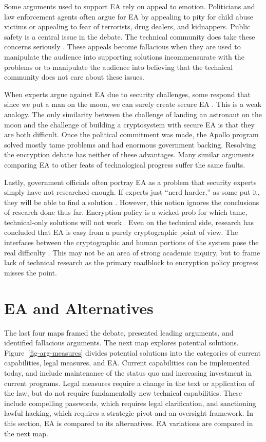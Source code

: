 \documentclass{IEEEtran}
\newcommand{\myfig}[1]{Figure~\ref{#1}}
\begin{document}
Some arguments used to support \ac{EA} rely on appeal to emotion. Politicians and law enforcement agents often argue for
\ac{EA} by appealing to pity for child abuse victims or appealing to fear of terrorists, drug dealers, and kidnappers.
Public safety is a central issue in the debate. The technical community does take these concerns seriously
\cite{schneier_scaring_2019}. These appeals become fallacious when they are used to manipulate the audience into
supporting solutions incommensurate with the problems or to manipulate the audience into believing that the technical
community does not care about these issues.

When experts argue against \ac{EA} due to security challenges, some respond that since we put a man on the moon, we can
surely create secure \ac{EA} \cite{cushing_moon_2018}. This is a weak analogy. The only similarity between the challenge
of landing an astronaut on the moon and the challenge of building a cryptosystem with secure EA is that they are both
difficult. Once the political commitment was made, the Apollo program solved mostly tame problems and had enormous
government backing. Resolving the encryption debate has neither of these advantages. Many similar arguments comparing
\ac{EA} to other feats of technological progress suffer the same faults.

Lastly, government officials often portray \ac{EA} as a problem that security experts simply have not researched enough.
If experts just ``nerd harder,'' as some put it, they will be able to find a solution \cite{schneier_2019}. However,
this notion ignores the conclusions of research done thus far. Encryption policy is a \ac{wicked-prob} for which tame,
technical-only solutions will not work \cite{rozenshtein_wicked_2018}. Even on the technical side, research has
concluded that \ac{EA} is easy from a purely cryptographic point of view. The interfaces between the cryptographic and
human portions of the system pose the real difficulty \cite{abelson_risks_1997} \cite{abelson_2015}. This may not be an
area of strong academic inquiry, but to frame lack of technical research as the primary roadblock to encryption policy
progress misses the point.


\section{EA and Alternatives}

The last four maps framed the debate, presented leading arguments, and identified fallacious arguments. The next map
explores potential solutions. \myfig{fig-arg-measures} divides potential solutions into the categories of current
capabilities, legal measures, and \ac{EA}. Current capabilities can be implemented today, and include maintenance of the
status quo and increasing investment in current programs. Legal measures require a change in the text or application of
the law, but do not require fundamentally new technical capabilities. These include compelling passwords, which requires
legal clarification, and sanctioning lawful hacking, which requires a strategic pivot and an oversight framework. In this section, \ac{EA} is compared to its
alternatives. \ac{EA} variations are compared in the next map.
\end{document}
